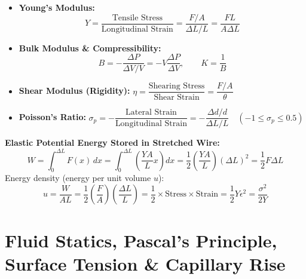 \documentclass[10pt,twoside,openright]{book}
\begin{document}
\begin{formulabox}
\begin{itemize}[leftmargin=1.2em, itemsep=2pt]
  \item \textbf{Young's Modulus:}
  \[
    Y = \frac{\text{Tensile Stress}}{\text{Longitudinal Strain}} = \frac{F/A}{\Delta L/L} = \frac{F L}{A \Delta L}
  \]
  \item \textbf{Bulk Modulus \& Compressibility:}
  \[
    B = -\frac{\Delta P}{\Delta V / V} = -V\frac{\Delta P}{\Delta V}, \qquad K = \frac{1}{B}
  \]
  \item \textbf{Shear Modulus (Rigidity):} $\eta = \dfrac{\text{Shearing Stress}}{\text{Shear Strain}} = \dfrac{F/A}{\theta}$
  \item \textbf{Poisson's Ratio:} $\sigma_p = -\dfrac{\text{Lateral Strain}}{\text{Longitudinal Strain}} = -\dfrac{\Delta d/d}{\Delta L/L} \quad (-1 \le \sigma_p \le 0.5)$
\end{itemize}
\textbf{Elastic Potential Energy Stored in Stretched Wire:}
\begin{equation}
  W = \int_0^{\Delta L} F(x)\,dx = \int_0^{\Delta L} \left(\frac{YA}{L}x\right)dx = \frac{1}{2}\left(\frac{YA}{L}\right)(\Delta L)^2 = \frac{1}{2}F\Delta L
\end{equation}
Energy density (energy per unit volume $u$):
\begin{equation}
  u = \frac{W}{A L} = \frac{1}{2}\left(\frac{F}{A}\right)\left(\frac{\Delta L}{L}\right) = \frac{1}{2}\times\text{Stress}\times\text{Strain} = \frac{1}{2}Y\epsilon^2 = \frac{\sigma^2}{2Y}
\end{equation}
\end{formulabox}

\section{Fluid Statics, Pascal's Principle, Surface Tension \& Capillary Rise}
\end{document}
